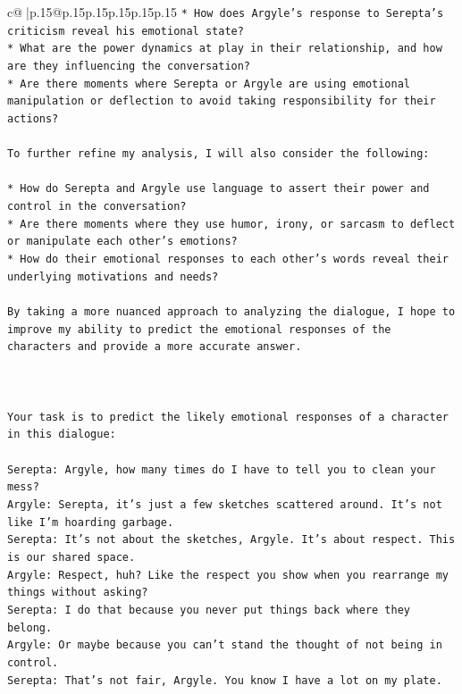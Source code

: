 \documentclass{article}
\begin{document}
{\begin{supertabular}{c@{$\;$}|p{.15\linewidth}@{}p{.15\linewidth}p{.15\linewidth}p{.15\linewidth}p{.15\linewidth}p{.15\linewidth}}
{{{\texttt{* How does Argyle's response to Serepta's criticism reveal his emotional state?} \\
\texttt{* What are the power dynamics at play in their relationship, and how are they influencing the conversation?} \\
\texttt{* Are there moments where Serepta or Argyle are using emotional manipulation or deflection to avoid taking responsibility for their actions?} \\
\\ 
\texttt{To further refine my analysis, I will also consider the following:} \\
\\ 
\texttt{* How do Serepta and Argyle use language to assert their power and control in the conversation?} \\
\texttt{* Are there moments where they use humor, irony, or sarcasm to deflect or manipulate each other's emotions?} \\
\texttt{* How do their emotional responses to each other's words reveal their underlying motivations and needs?} \\
\\ 
\texttt{By taking a more nuanced approach to analyzing the dialogue, I hope to improve my ability to predict the emotional responses of the characters and provide a more accurate answer.} \\
\\ 
\\ 
\\ 
\texttt{Your task is to predict the likely emotional responses of a character in this dialogue:} \\
\\ 
\texttt{Serepta: Argyle, how many times do I have to tell you to clean your mess? } \\
\texttt{Argyle: Serepta, it's just a few sketches scattered around. It's not like I'm hoarding garbage.} \\
\texttt{Serepta: It's not about the sketches, Argyle. It's about respect. This is our shared space.} \\
\texttt{Argyle: Respect, huh? Like the respect you show when you rearrange my things without asking?} \\
\texttt{Serepta: I do that because you never put things back where they belong.} \\
\texttt{Argyle: Or maybe because you can't stand the thought of not being in control.} \\
\texttt{Serepta: That's not fair, Argyle. You know I have a lot on my plate.} \\
}}}
\end{supertabular}}
\end{document}
